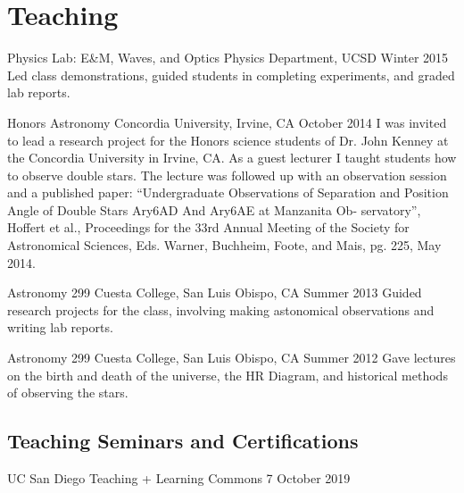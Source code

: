 \section{Teaching}

    {Physics Lab: E\&M, Waves, and Optics}
    {Physics Department, UCSD}
    {Winter 2015} 
Led class demonstrations, guided students in completing experiments, and graded lab reports.

    {Honors Astronomy}
    {Concordia University, Irvine, CA}
    {October 2014}
I was invited to lead a research project for the Honors science students of Dr. John Kenney at the Concordia University in Irvine, CA. As a guest lecturer I taught students how to observe double stars. The lecture was followed up with an observation session and a published paper:
``Undergraduate Observations of Separation and Position Angle of Double Stars Ary6AD And Ary6AE at Manzanita Ob- servatory'', Hoffert et al., Proceedings for the 33rd Annual Meeting of the Society for Astronomical Sciences, Eds. Warner, Buchheim, Foote, and Mais, pg. 225, May 2014.

    {Astronomy 299}
    {Cuesta College, San Luis Obispo, CA}
    {Summer 2013}
Guided research projects for the class, involving making astonomical observations and writing lab reports.

    {Astronomy 299}
    {Cuesta College, San Luis Obispo, CA}
    {Summer 2012}
Gave lectures on the birth and death of the universe, the HR Diagram, and historical methods of observing the stars.

\subsection{Teaching Seminars and Certifications}
    {UC San Diego Teaching + Learning Commons}
    {7 October 2019}
